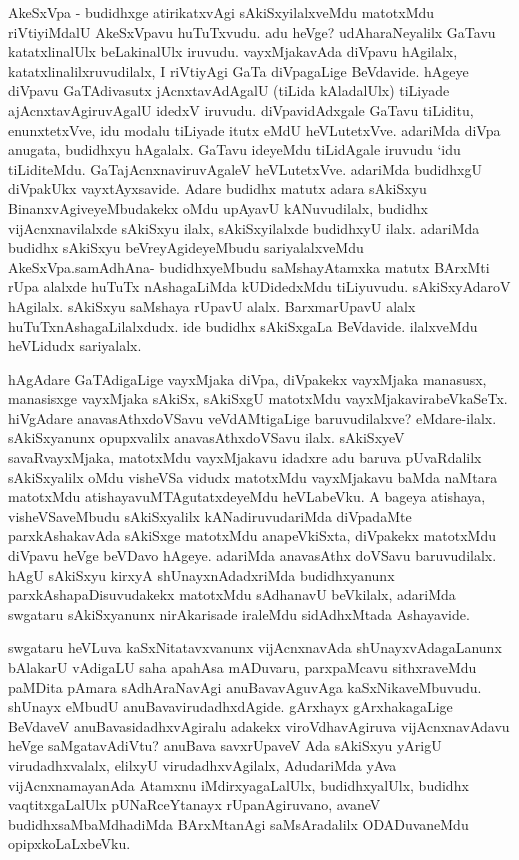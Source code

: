 \begin{artha}
AkeSxVpa - budidhxge atirikatxvAgi sAkiSxyilalxveMdu matotxMdu riVtiyiMdalU AkeSxVpavu huTuTxvudu. adu heVge? udAharaNeyalilx GaTavu katatxlinalUlx beLakinalUlx iruvudu. vayxMjakavAda diVpavu hAgilalx, katatxlinalilxruvudilalx, I riVtiyAgi GaTa diVpagaLige BeVdavide. hAgeye diVpavu GaTAdivasutx jAcnxtavAdAgalU (tiLida kAladalUlx) tiLiyade ajAcnxtavAgiruvAgalU idedxV iruvudu. diVpavidAdxgale GaTavu tiLiditu, enunxtetxVve, idu modalu tiLiyade itutx eMdU heVLutetxVve. adariMda diVpa anugata, budidhxyu hAgalalx. GaTavu ideyeMdu tiLidAgale iruvudu `idu tiLiditeMdu. GaTajAcnxnaviruvAgaleV heVLutetxVve. adariMda budidhxgU diVpakUkx vayxtAyxsavide. Adare budidhx matutx adara sAkiSxyu BinanxvAgiveyeMbudakekx oMdu upAyavU kANuvudilalx, budidhx vijAcnxnavilalxde sAkiSxyu ilalx, sAkiSxyilalxde budidhxyU ilalx. adariMda budidhx sAkiSxyu beVreyAgideyeMbudu sariyalalxveMdu AkeSxVpa.\break samAdhAna- budidhxyeMbudu saMshayAtamxka matutx BArxMti rUpa alalxde huTuTx nAshagaLiMda kUDidedxMdu tiLiyuvudu. sAkiSxyAdaroV hAgilalx. sAkiSxyu saMshaya rUpavU alalx. BarxmarUpavU alalx huTuTxnAshagaLilalxdudx. ide budidhx sAkiSxgaLa BeVdavide. ilalxveMdu heVLidudx sariyalalx. 
\end{artha}%
\newpage
\begin{artha}
hAgAdare GaTAdigaLige vayxMjaka diVpa, diVpakekx vayxMjaka manasusx, manasisxge vayxMjaka sAkiSx, sAkiSxgU matotxMdu vayxMjakavirabeVkaSeTx. hiVgAdare anavasAthxdoVSavu veVdAMtigaLige baruvudilalxve? eMdare-\break ilalx. sAkiSxyanunx opupxvalilx anavasAthxdoVSavu ilalx. sAkiSxyeV savaRvayxMjaka, matotxMdu vayxMjakavu idadxre adu baruva pUvaRdalilx sAkiSxyalilx oMdu visheVSa vidudx matotxMdu vayxMjakavu baMda naMtara matotxMdu atishayavuMTAgutatxdeyeMdu heVLabeVku. A bageya atishaya, visheVSaveMbudu sAkiSxyalilx kANadiruvudariMda diVpadaMte parxkAshakavAda sAkiSxge matotxMdu anapeVkiSxta, diVpakekx matotxMdu diVpavu heVge beVDavo hAgeye. adariMda anavasAthx doVSavu baruvudilalx. hAgU sAkiSxyu kirxyA shUnayxnAdadxriMda budidhxyanunx parxkAshapaDisuvudakekx matotxMdu sAdhanavU beVkilalx, adariMda swgataru sAkiSxyanunx nirAkarisade iraleMdu sidAdhxMtada Ashayavide. 
\end{artha}

\begin{artha}
swgataru heVLuva kaSxNitatavxvanunx vijAcnxnavAda shUnayxvAdagaLanunx bAlakarU vAdigaLU saha apahAsa mADuvaru, parxpaMcavu sithxraveMdu paMDita pAmara sAdhAraNavAgi anuBavavAguvAga kaSxNikaveMbuvudu. shUnayx eMbudU anuBavavirudadhxdAgide. gArxhayx gArxhakagaLige BeVdaveV anuBavasidadhxvAgiralu adakekx viroVdhavAgiruva vijAcnxnavAdavu heVge saMgatavAdiVtu? anuBava savxrUpaveV Ada sAkiSxyu yArigU virudadhxvalalx, elilxyU virudadhxvAgilalx, AdudariMda yAva vijAcnxnamayanAda Atamxnu iMdirxyagaLalUlx, budidhxyalUlx, budidhx vaqtitxgaLalUlx pUNaRceYtanayx rUpanAgiruvano, avaneV budidhxsaMbaMdhadiMda BArxMtanAgi saMsAradalilx ODADuvaneMdu opipxkoLaLxbeVku. 
\end{artha}%

